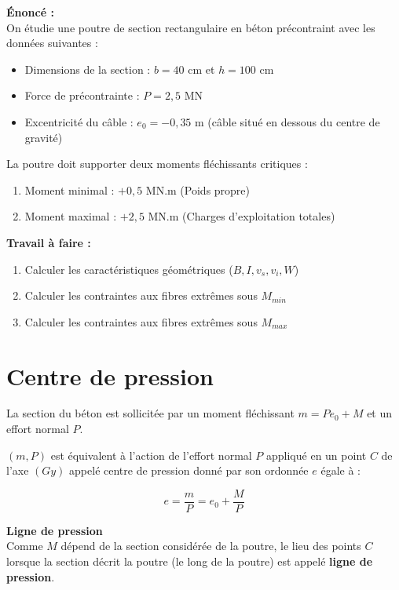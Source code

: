 \documentclass[12pt,a4paper]{article}
\begin{document}
\begin{examplebox}
\textbf{Énoncé :}\\
On étudie une poutre de section rectangulaire en béton précontraint avec les données suivantes :
\begin{itemize}
    \item Dimensions de la section : $b = 40$ cm et $h = 100$ cm
    \item Force de précontrainte : $P = 2,5$ MN
    \item Excentricité du câble : $e_0 = -0,35$ m (câble situé en dessous du centre de gravité)
\end{itemize}

La poutre doit supporter deux moments fléchissants critiques :
\begin{enumerate}
    \item Moment minimal : $+0,5$ MN.m (Poids propre)
    \item Moment maximal : $+2,5$ MN.m (Charges d'exploitation totales)
\end{enumerate}

\textbf{Travail à faire :}
\begin{enumerate}
    \item Calculer les caractéristiques géométriques ($B, I, v_s, v_i, W$)
    \item Calculer les contraintes aux fibres extrêmes sous $M_{min}$
    \item Calculer les contraintes aux fibres extrêmes sous $M_{max}$
\end{enumerate}
\end{examplebox}

\section{Centre de pression}

La section du béton est sollicitée par un moment fléchissant $m = Pe_0 + M$ et un effort normal $P$.

$(m, P)$ est équivalent à l'action de l'effort normal $P$ appliqué en un point $C$ de l'axe $(Gy)$ appelé centre de pression donné par son ordonnée $e$ égale à :

\begin{equation}
e = \frac{m}{P} = e_0 + \frac{M}{P}
\end{equation}

\begin{definitionbox}
\textbf{Ligne de pression}\\
Comme $M$ dépend de la section considérée de la poutre, le lieu des points $C$ lorsque la section décrit la poutre (le long de la poutre) est appelé \textbf{ligne de pression}.
\end{definitionbox}
\end{document}
